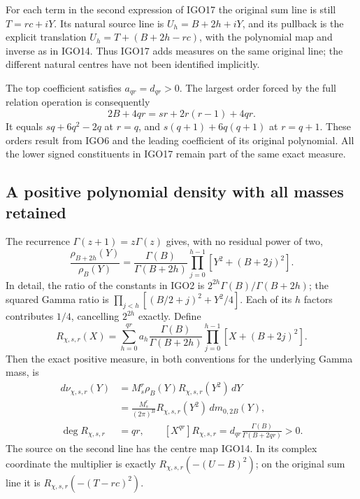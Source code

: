 \documentclass[11pt,a4paper]{article}
\begin{document}
For each term in the second expression of IGO17 the original
sum line is still $T=rc+iY$. Its natural source line is
$U_h=B+2h+iY$, and its pullback is the explicit translation
$U_h=T+(B+2h-rc)$, with the polynomial map and inverse as in
IGO14. Thus IGO17 adds measures on the same original line; the
different natural centres have not been identified implicitly.

The top coefficient satisfies $a_{qr}=d_{qr}>0$. The largest
order forced by the full relation operation is consequently
\[
 2B+4qr=sr+2r(r-1)+4qr.
 \tag{IGO18}
\]
It equals $sq+6q^2-2q$ at $r=q$, and
$s(q+1)+6q(q+1)$ at $r=q+1$. These orders result from IGO6
and the leading coefficient of its original polynomial.
All the lower signed constituents in IGO17 remain part of the
same exact measure.

\subsection{A positive polynomial density with all masses retained}
The recurrence $\Gamma(z+1)=z\Gamma(z)$ gives, with no residual
power of two,
\[
 \frac{\rho_{B+2h}(Y)}{\rho_B(Y)}
 =\frac{\Gamma(B)}{\Gamma(B+2h)}
       \prod_{j=0}^{h-1}\left[Y^2+(B+2j)^2\right].
 \tag{IGO19}
\]
In detail, the ratio of the constants in IGO2 is
$2^{2h}\Gamma(B)/\Gamma(B+2h)$; the squared Gamma ratio is
$\prod_{j<h}[(B/2+j)^2+Y^2/4]$. Each of its $h$ factors
contributes $1/4$, cancelling $2^{2h}$ exactly. Define
\[
 R_{\chi,s,r}(X)=\sum_{h=0}^{qr}
   a_h\frac{\Gamma(B)}{\Gamma(B+2h)}
      \prod_{j=0}^{h-1}[X+(B+2j)^2].
 \tag{IGO20}
\]
Then the exact positive measure, in both conventions for the
underlying Gamma mass, is
\[
 \begin{split}
 d\nu_{\chi,s,r}(Y)
    &=M_s^r\rho_B(Y)R_{\chi,s,r}(Y^2)\,dY\\
    &=\frac{M_s^r}{(2\pi)^B}
           R_{\chi,s,r}(Y^2)\,dm_{0,2B}(Y),\\
 \deg R_{\chi,s,r}&=qr,\qquad
 [X^{qr}]R_{\chi,s,r}
       =d_{qr}\frac{\Gamma(B)}{\Gamma(B+2qr)}>0.
 \end{split}
 \tag{IGO21}
\]
The source on the second line has the centre map IGO14. In its
complex coordinate the multiplier is exactly
$R_{\chi,s,r}(-(U-B)^2)$; on the original sum line it is
$R_{\chi,s,r}(-(T-rc)^2)$.
\end{document}
